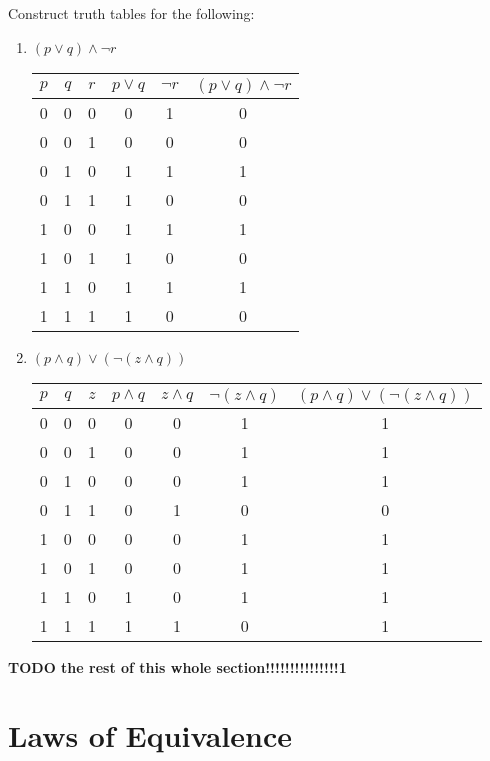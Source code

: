 \documentclass[12pt, leqno]{article}
\begin{document}
Construct truth tables for the following:
\begin{enumerate}
    \item $(p \lor q) \land \neg r$\\
    \begin{tabular}{ |c|c|c|c|c|c| }
        \hline
        $p$ & $q$ & $r$ & $p \lor q$ & $\neg r$ & $(p \lor q) \land \neg r$ \\ 
        \hline
        0 & 0 & 0 & 0 & 1 & 0 \\
        \hline
        0 & 0 & 1 & 0 & 0 & 0 \\
        \hline
        0 & 1 & 0 & 1 & 1 & 1 \\
        \hline
        0 & 1 & 1 & 1 & 0 & 0 \\
        \hline
        1 & 0 & 0 & 1 & 1 & 1 \\
        \hline
        1 & 0 & 1 & 1 & 0 & 0 \\
        \hline
        1 & 1 & 0 & 1 & 1 & 1 \\
        \hline
        1 & 1 & 1 & 1 & 0 & 0 \\
        \hline
    \end{tabular}
    \item $(p \land q) \lor (\neg (z \land q))$\\
    \begin{tabular}{ |c|c|c|c|c|c|c| }
        \hline
        $p$ & $q$ & $z$ & $p \land q$ & $z \land q$ & $\neg (z \land q)$ & $(p \land q) \lor (\neg (z \land q))$ \\
        \hline
        0 & 0 & 0 & 0 & 0 & 1 & 1 \\
        \hline
        0 & 0 & 1 & 0 & 0 & 1 & 1 \\
        \hline
        0 & 1 & 0 & 0 & 0 & 1 & 1 \\
        \hline
        0 & 1 & 1 & 0 & 1 & 0 & 0 \\
        \hline
        1 & 0 & 0 & 0 & 0 & 1 & 1 \\
        \hline
        1 & 0 & 1 & 0 & 0 & 1 & 1 \\
        \hline
        1 & 1 & 0 & 1 & 0 & 1 & 1 \\
        \hline
        1 & 1 & 1 & 1 & 1 & 0 & 1 \\
        \hline
    \end{tabular}
\end{enumerate}

\textbf{TODO the rest of this whole section!!!!!!!!!!!!!!!1}

\section{Laws of Equivalence}
\end{document}
